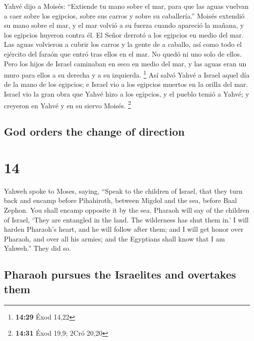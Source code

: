\begin{paracol}{2}
 Yahvé dijo a Moisés: ``Extiende tu mano sobre el mar,
para que las aguas vuelvan a caer sobre los egipcios, sobre sus carros y
sobre su caballería.''  Moisés extendió su mano sobre el
mar, y el mar volvió a su fuerza cuando apareció la mañana, y los
egipcios huyeron contra él. El Señor derrotó a los egipcios en medio del
mar.  Las aguas volvieron a cubrir los carros y la gente
de a caballo, así como todo el ejército del faraón que entró tras ellos
en el mar. No quedó ni uno solo de ellos.  Pero los hijos
de Israel caminaban en seco en medio del mar, y las aguas eran un muro
para ellos a su derecha y a su izquierda. \footnote{\textbf{14:29} Éxod
  14,22}  Así salvó Yahvé a Israel aquel día de la mano
de los egipcios; e Israel vio a los egipcios muertos en la orilla del
mar.  Israel vio la gran obra que Yahvé hizo a los
egipcios, y el pueblo temió a Yahvé; y creyeron en Yahvé y en su siervo
Moisés. \footnote{\textbf{14:31} Éxod 19,9; 2Cró 20,20}

\switchcolumn
\begin{otherlanguage}{english}

\hypertarget{god-orders-the-change-of-direction}{%
\subsection{God orders the change of
direction}\label{god-orders-the-change-of-direction}}

\hypertarget{section-27}{%
\section{14}\label{section-27}}

 Yahweh spoke to Moses, saying,  ``Speak to
the children of Israel, that they turn back and encamp before
Pihahiroth, between Migdol and the sea, before Baal Zephon. You shall
encamp opposite it by the sea.  Pharaoh will say of the
children of Israel, `They are entangled in the land. The wilderness has
shut them in.'  I will harden Pharaoh's heart, and he will
follow after them; and I will get honor over Pharaoh, and over all his
armies; and the Egyptians shall know that I am Yahweh.'' They did so.

\hypertarget{pharaoh-pursues-the-israelites-and-overtakes-them}{%
\subsection{Pharaoh pursues the Israelites and overtakes
them}\label{pharaoh-pursues-the-israelites-and-overtakes-them}}


\end{otherlanguage}
\end{paracol}
